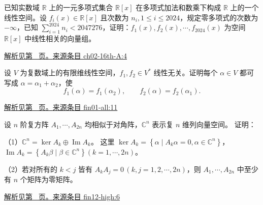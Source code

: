 \documentclass[UTF8,12pt,a4paper,fontset=fandol]{ctexart}
\begin{document}
\begin{example}\label{ex:ch02-16th-A:4}

已知实数域 $\mathbb{R}$ 上的一元多项式集合 $\mathbb{R}[x]$ 在多项式加法和数乘下构成 $\mathbb{R}$ 上的一个线性空间。设 $f_{i}(x) \in \mathbb{R}[x]$ 且次数为 $n_{i}, 1 \leq i \leq 2024$，规定零多项式的次数为 $-\infty$，已知 $\sum_{i=1}^{2024} n_{i} < 2047276$，证明：$f_{1}(x), f_{2}(x), \cdots, f_{2024}(x)$ 为空间 $\mathbb{R}[x]$ 中线性相关的向量组。

\par\hyperref[ans:ch02-16th-A:4]{解析见第~\pageref{ans:ch02-16th-A:4} 页。}\quad\href{https://github.com/lzxcr/cmc-mathematics/blob/64916fa1fdbc3e444a652eca204d5669058ee321/src/problems/preliminary/16/04.md}{来源条目 ch02-16th-A:4}

\end{example}

\begin{example}\label{ex:fin01-all:11}

设 $V$ 为复数域上的有限维线性空间，$f_1,f_2\in V^*$ 线性无关。证明每个 $\alpha\in V$ 都可写成 $\alpha=\alpha_1+\alpha_2$，使
\[
f_1(\alpha)=f_1(\alpha_2),\qquad f_2(\alpha)=f_2(\alpha_1).
\]

\par\hyperref[ans:fin01-all:11]{解析见第~\pageref{ans:fin01-all:11} 页。}\quad\href{https://github.com/lzxcr/cmc-mathematics/blob/64916fa1fdbc3e444a652eca204d5669058ee321/src/problems/finals/01/11.md}{来源条目 fin01-all:11}

\end{example}

\begin{example}\label{ex:fin12-high:6}

设 $n$ 阶复方阵 $A_{1},\cdots,A_{2n}$ 均相似于对角阵，$\mathbb{C}^{n}$ 表示复 $n$ 维列向量空间。 证明：

（1）$\mathbb{C}^{n}=\ker A_{k}\oplus\operatorname{Im} A_{k}$。 这里
$\ker A_{k}=\left\{\alpha\mid A_{k}\alpha=0,\alpha\in\mathbb{C}^{n}\right\}$，
$\operatorname{Im} A_{k}=\left\{A_{k}\beta\mid\beta\in\mathbb{C}^{n}\right\}(k=1,\cdots,2n)$。

（2）若对所有的 $k<j$ 皆有 $A_{k}A_{j}=0\,(k,j=1,2,\cdots,2n)$，则 $A_{1},\cdots,A_{2n}$ 中至少有 $n$ 个矩阵为零矩阵。

\par\hyperref[ans:fin12-high:6]{解析见第~\pageref{ans:fin12-high:6} 页。}\quad\href{https://github.com/lzxcr/cmc-mathematics/blob/64916fa1fdbc3e444a652eca204d5669058ee321/src/problems/finals/12/06.md}{来源条目 fin12-high:6}

\end{example}
\end{document}
